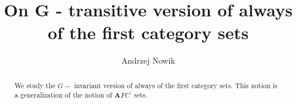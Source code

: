 \documentclass[b5cutpaper, twoside, 11pt, leqno]{moravica}
\newcommand{\afcp}{{\mathbf AFC}^\prime}
\theoremstyle{definition}
\begin{document}
\long{}


\title[On G - transitive version of always of the first category sets]{
On G - transitive version of always of the first category sets}

\author[Andrzej Nowik]{Andrzej Nowik}
\address{University of Gda\'nsk, \newline
Institute of Mathematics \newline
Wita Stwosza 57  -- 952 Gda\'nsk \newline
Poland}


\date{}

\begin{abstract}
  We study the $G-$ invariant version of always of
the first category sets.
  This notion is a generalization of the notion of
$\afcp$ sets.
\end{abstract}

\maketitle

\end{document}
